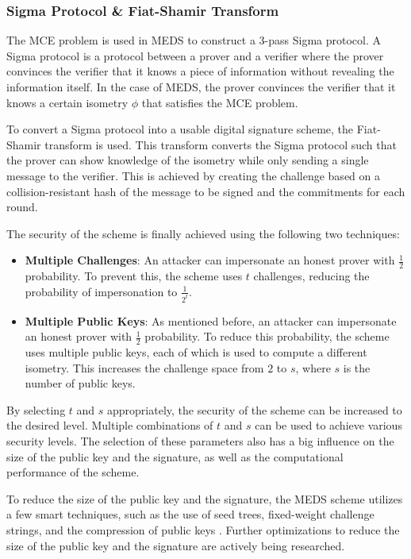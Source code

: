 \documentclass[11pt,a4paper]{report}
\begin{document}
\subsubsection{Sigma Protocol \& Fiat-Shamir Transform}
The MCE problem is used in MEDS to construct a 3-pass Sigma protocol. A Sigma protocol is a protocol between a prover and a verifier where the prover convinces the verifier that it knows a piece of information without revealing the information itself. In the case of MEDS, the prover convinces the verifier that it knows a certain isometry $\phi$ that satisfies the MCE problem.

To convert a Sigma protocol into a usable digital signature scheme, the Fiat-Shamir transform \cite{fiat1986prove} is used. This transform converts the Sigma protocol such that the prover can show knowledge of the isometry while only sending a single message to the verifier. This is achieved by creating the challenge based on a collision-resistant hash of the message to be signed and the commitments for each round.

The security of the scheme is finally achieved using the following two techniques:
\begin{itemize}
  \item \textbf{Multiple Challenges}: An attacker can impersonate an honest prover with $\frac{1}{2}$ probability. To prevent this, the scheme uses $t$ challenges, reducing the probability of impersonation to $\frac{1}{2^t}$.
  \item \textbf{Multiple Public Keys}: As mentioned before, an attacker can impersonate an honest prover with $\frac{1}{2}$ probability. To reduce this probability, the scheme uses multiple public keys, each of which is used to compute a different isometry. This increases the challenge space from $2$ to $s$, where $s$ is the number of public keys.
\end{itemize}
By selecting $t$ and $s$ appropriately, the security of the scheme can be increased to the desired level. Multiple combinations of $t$ and $s$ can be used to achieve various security levels. The selection of these parameters also has a big influence on the size of the public key and the signature, as well as the computational performance of the scheme.

To reduce the size of the public key and the signature, the MEDS scheme utilizes a few smart techniques, such as the use of seed trees, fixed-weight challenge strings, and the compression of public keys \cite{chou2023meds}. Further optimizations to reduce the size of the public key and the signature are actively being researched.
\end{document}
